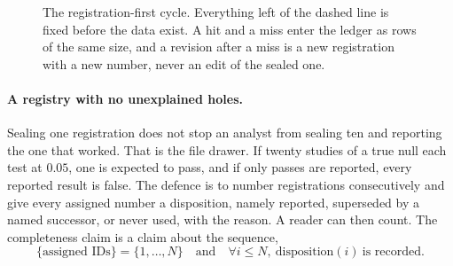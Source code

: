 \begin{figure}[tbp]
\centering
{}
\caption{The registration-first cycle. Everything left of the dashed line is fixed before the data exist. A hit and a miss enter the ledger as rows of the same size, and a revision after a miss is a new registration with a new number, never an edit of the sealed one.}
\label{fig:ch09:cycle}
\end{figure}

\paragraph{A registry with no unexplained holes.} Sealing one registration does not stop an analyst from sealing ten and reporting the one that worked. That is the file drawer. If twenty studies of a true null each test at $0.05$, one is expected to pass, and if only passes are reported, every reported result is false. The defence is to number registrations consecutively and give every assigned number a disposition, namely reported, superseded by a named successor, or never used, with the reason. A reader can then count. The completeness claim is a claim about the sequence,
\begin{equation}
\{\text{assigned IDs}\}=\{1,\dots,N\}\quad\text{and}\quad \forall i\le N,\ \text{disposition}(i)\ \text{is recorded}.
\label{eq:ch09:registry}
\end{equation}

